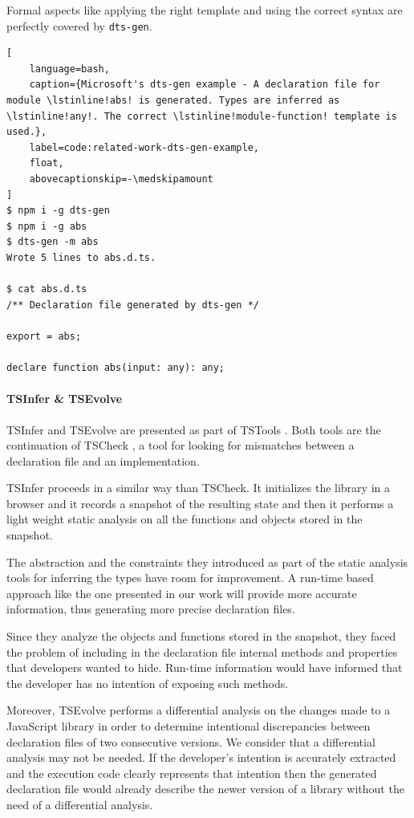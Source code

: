\documentclass[english,cleveref,autoref,submission]{programming}
\begin{document}
Formal aspects like applying the right template and using the correct syntax are perfectly covered by \texttt{dts-gen}.

\begin{lstlisting}[
    language=bash,
    caption={Microsoft's dts-gen example - A declaration file for module \lstinline!abs! is generated. Types are inferred as \lstinline!any!. The correct \lstinline!module-function! template is used.},
	label=code:related-work-dts-gen-example,
    float,
    abovecaptionskip=-\medskipamount
]
$ npm i -g dts-gen
$ npm i -g abs
$ dts-gen -m abs
Wrote 5 lines to abs.d.ts.

$ cat abs.d.ts
/** Declaration file generated by dts-gen */

export = abs;

declare function abs(input: any): any;
\end{lstlisting}

\paragraph*{TSInfer \& TSEvolve}
TSInfer and TSEvolve are presented as part of TSTools \cite{DBLP:conf/fase/KristensenM17}. Both tools are the continuation of TSCheck \cite{DBLP:conf/oopsla/FeldthausM14}, a tool for looking for mismatches between a declaration file and an implementation.

TSInfer proceeds in a similar way than TSCheck. It initializes the library in a browser and it records a snapshot of the resulting state and then it performs a light weight static analysis on all the functions and objects stored in the snapshot.

The abstraction and the constraints they introduced as part of the static analysis tools for inferring the types have room for improvement. A run-time based approach like the one presented in our work will provide more accurate information, thus generating more precise declaration files.

Since they analyze the objects and functions stored in the snapshot, they faced the problem of including in the declaration file internal methods and properties that developers wanted to hide. Run-time information would have informed that the developer has no intention of exposing such methods.

Moreover, TSEvolve performs a differential analysis on the changes made to a JavaScript library in order to determine intentional discrepancies between declaration files of two consecutive versions. We consider that a differential analysis may not be needed. If the developer's intention is accurately extracted and the execution code clearly represents that intention then the generated declaration file would already describe the newer version of a library without the need of a differential analysis.
\end{document}
